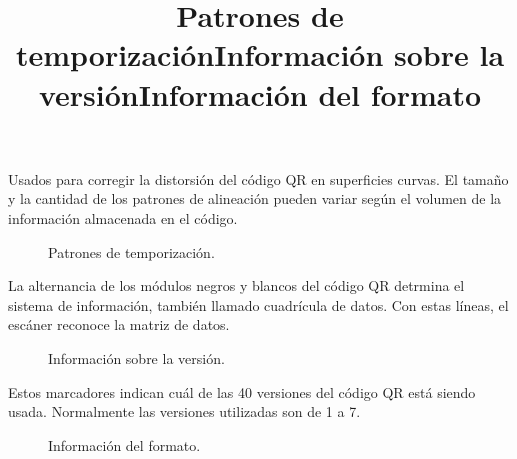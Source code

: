 Usados para corregir la distorsión del código QR en superficies curvas. El tamaño y la cantidad de los patrones de alineación pueden variar según el volumen de la información almacenada en el código. \\

\title{Patrones de temporización}

\begin{figure}[htbp]
	\begin{center}
		\caption{Patrones de temporización.}
		\label{fig:casosDeUso}
	\end{center}
\end{figure}

La alternancia de los módulos negros y blancos del código QR detrmina el sistema de información, también llamado cuadrícula de datos. Con estas líneas, el escáner reconoce la matriz de datos. 

\newpage

\title{Información sobre la versión}

\begin{figure}[htbp]
	\begin{center}
		\caption{Información sobre la versión.}
		\label{fig:casosDeUso}
	\end{center}
\end{figure}

Estos marcadores indican cuál de las 40 versiones del código QR está siendo usada. Normalmente las versiones utilizadas son de 1 a 7. \\

\title{Información del formato}

\begin{figure}[htbp]
	\begin{center}
		\caption{Información del formato.}
		\label{fig:casosDeUso}
	\end{center}
\end{figure}

